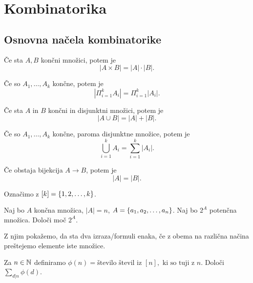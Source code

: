 \section{Kombinatorika}
\subsection{Osnovna načela kombinatorike}
\begin{trditev}
    Če sta $A, B$ končni množici, potem je $$|A \times B| = |A| \cdot |B|.$$
\end{trditev}

\begin{trditev}
    Če so $A_1, \ldots, A_k$ končne, potem je $$|\Pi_{i=1}^k A_i| = \Pi_{i=1}^k |A_i|.$$
\end{trditev}

\begin{trditev}
    Če sta $A$ in $B$ končni in disjunktni množici, potem je $$|A \cup B| = |A| + |B|.$$
\end{trditev}

\begin{trditev}
    Če so $A_1, \ldots, A_k$ končne, paroma disjunktne množice, potem je $$\bigcup_{i=1}^k A_i = \sum_{i=1}^{k} |A_i|.$$
\end{trditev}

\begin{trditev}
    Če obstaja bijekcija $A \to B$, potem je $$|A|=|B|.$$
\end{trditev}

Označimo z $[k] = \left\{1, 2, \ldots, k\right\}$.

\begin{primer}
    Naj bo $A$ končna množica, $|A| = n$, $A = \left\{a_1, a_2, \ldots, a_n\right\}$. Naj bo $2^A$ potenčna množica. Določi moč $2^A$.
\end{primer}

\begin{trditev}
    Z njim pokažemo, da sta dva izraza/formuli enaka, če z obema na različna načina preštejemo elemente iste množice.
\end{trditev}

\begin{primer}
    Za $n \in \mathbb{N}$ definiramo $\phi(n) = \text{število števil iz } [n], \text{ ki so tuji z } n.$ Določi $\sum_{d | n} \phi(d)$.
\end{primer}

